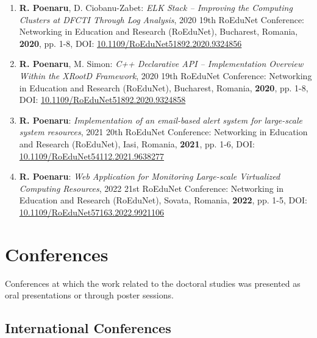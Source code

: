 \begin{enumerate}
    \item \textbf{R. Poenaru}, D. Ciobanu-Zabet: \emph{ELK Stack – Improving the Computing Clusters at DFCTI Through Log Analysis}, 2020 19th RoEduNet Conference: Networking in Education and Research (RoEduNet), Bucharest, Romania, \textbf{2020}, pp. 1-8, DOI: \href{https://ieeexplore.ieee.org/abstract/document/9324856}{10.1109/RoEduNet51892.2020.9324856}
    \item \textbf{R. Poenaru}, M. Simon: \emph{C++ Declarative API – Implementation Overview Within the XRootD Framework}, 2020 19th RoEduNet Conference: Networking in Education and Research (RoEduNet), Bucharest, Romania, \textbf{2020}, pp. 1-8, DOI: \href{https://ieeexplore.ieee.org/abstract/document/9324858}{10.1109/RoEduNet51892.2020.9324858}
    \item \textbf{R. Poenaru}: \emph{Implementation of an email-based alert system for large-scale system resources}, 2021 20th RoEduNet Conference: Networking in Education and Research (RoEduNet), Iasi, Romania, \textbf{2021}, pp. 1-6, DOI: \href{https://ieeexplore.ieee.org/abstract/document/9638277}{10.1109/RoEduNet54112.2021.9638277}
    \item \textbf{R. Poenaru}: \emph{Web Application for Monitoring Large-scale Virtualized Computing Resources}, 2022 21st RoEduNet Conference: Networking in Education and Research (RoEduNet), Sovata, Romania, \textbf{2022}, pp. 1-5, DOI: \href{https://ieeexplore.ieee.org/abstract/document/9921106}{10.1109/RoEduNet57163.2022.9921106}
\end{enumerate}

\section{Conferences}

Conferences at which the work related to the doctoral studies was presented as oral presentations or through poster sessions.

\subsection{International Conferences}

